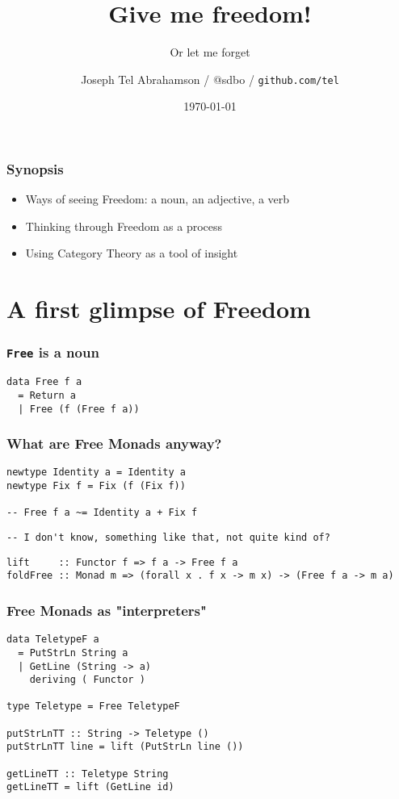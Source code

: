 \documentclass[pdf]{beamer}
\title{Give me freedom!}
\subtitle{Or let me forget}
\date{\today}
\author{Joseph Tel Abrahamson / @sdbo / \texttt{github.com/tel} }
\begin{document}
\maketitle

\begin{frame}
  \frametitle{Synopsis}
  \begin{itemize}
  \item Ways of seeing Freedom: a noun, an adjective, a verb
  \item Thinking through Freedom as a process
  \item Using Category Theory as a tool of insight
  \end{itemize}
\end{frame}

\section{A first glimpse of Freedom}

\begin{frame}[fragile]
  \frametitle{\texttt{Free} is a noun}
  \pause
\begin{lstlisting}
data Free f a
  = Return a
  | Free (f (Free f a))
\end{lstlisting}
\end{frame}

\begin{frame}
  \frametitle{What are Free Monads anyway?}
  \pause
\begin{lstlisting}
newtype Identity a = Identity a
newtype Fix f = Fix (f (Fix f))

-- Free f a ~= Identity a + Fix f
\end{lstlisting}
  \pause
\begin{lstlisting}
-- I don't know, something like that, not quite kind of?
\end{lstlisting}
\end{frame}


\begin{frame}[fragile]
\begin{lstlisting}
lift     :: Functor f => f a -> Free f a
foldFree :: Monad m => (forall x . f x -> m x) -> (Free f a -> m a)
\end{lstlisting}
\end{frame}

\begin{frame}[fragile]
  \frametitle{Free Monads as "interpreters"}
\begin{lstlisting}
data TeletypeF a 
  = PutStrLn String a 
  | GetLine (String -> a)
    deriving ( Functor )
                     
type Teletype = Free TeletypeF

putStrLnTT :: String -> Teletype ()
putStrLnTT line = lift (PutStrLn line ())

getLineTT :: Teletype String
getLineTT = lift (GetLine id)
\end{lstlisting}
\end{frame}
\end{document}
